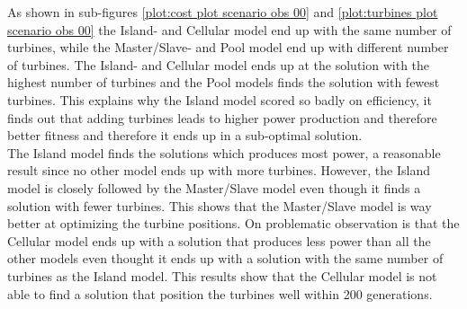 \noindent As shown in sub-figures \ref{plot:cost plot scenario obs 00} and \ref{plot:turbines plot scenario obs 00} the Island- and Cellular model end up with the same number of turbines, while the Master/Slave- and Pool model end up with different number of turbines. The Island- and Cellular model ends up at the solution with the highest number of turbines and the Pool models finds the solution with fewest turbines. This explains why the Island model scored so badly on efficiency, it finds out that adding turbines leads to higher power production and therefore better fitness and therefore it ends up in a sub-optimal solution. \\


\noindent The Island model finds the solutions which produces most power, a reasonable result since no other model ends up with more turbines. However, the Island model is closely followed by the Master/Slave model even though it finds a solution with fewer turbines. This shows that the Master/Slave model is way better at optimizing the turbine positions. On problematic observation is that the Cellular model ends up with a solution that produces less power than all the other models even thought it ends up with a solution with the same number of turbines as the Island model. This results show that the Cellular model is not able to find a solution that position the turbines well within 200 generations. \\


